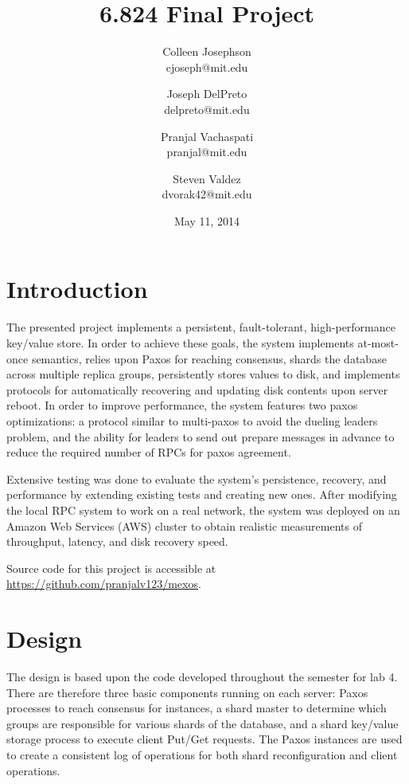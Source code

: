 \documentclass[letterpaper,10pt]{article}
\begin{document}
\title{\Large \bf 6.824 Final Project}
\author{
{\rm Colleen Josephson}\\
cjoseph@mit.edu
\and
{\rm Joseph DelPreto}\\
delpreto@mit.edu
\and
{\rm Pranjal Vachaspati}\\
pranjal@mit.edu
\and
{\rm Steven Valdez}\\
dvorak42@mit.edu
} %

\date{May 11, 2014}

\maketitle


\section{Introduction}
The presented project implements a persistent, fault-tolerant,
high-performance key/value store. In order to achieve these goals, the
system implements at-most-once semantics, relies upon Paxos for
reaching consensus, shards the database across multiple replica groups,
persistently stores values to disk, and implements protocols for
automatically recovering and updating disk contents upon server
reboot.  In order to improve performance, the system features two
paxos optimizations: a protocol similar to multi-paxos to avoid the
dueling leaders problem, and the ability for leaders to send out
prepare messages in advance to reduce the required number of RPCs for
paxos agreement.

Extensive testing was done to evaluate the system's persistence,
recovery, and performance by extending existing tests and creating new
ones.  After modifying the local RPC system to work on a real network,
the system was deployed on an Amazon Web Services (AWS) cluster to
obtain realistic measurements of throughput, latency, and disk
recovery speed.

Source code for this project is accessible at \url{https://github.com/pranjalv123/mexos}.

\section{Design} \label{sec:design} The design is based upon the code
developed throughout the semester for lab 4.  There are therefore
three basic components running on each server: Paxos processes to
reach consensus for instances, a shard master to determine which groups
are responsible for various shards of the database, and a shard
key/value storage process to execute client Put/Get requests.  The
Paxos instances are used to create a consistent log of operations for
both shard reconfiguration and client operations.
\end{document}
